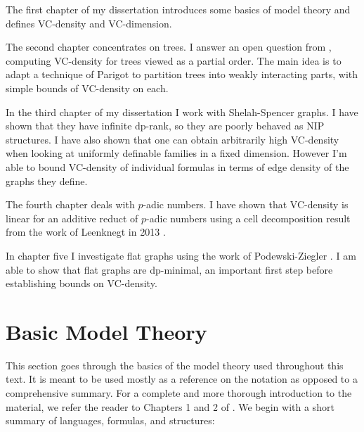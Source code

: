 The first chapter of my dissertation introduces some basics of model theory and defines VC-density and VC-dimension.

The second chapter concentrates on trees.
I answer an open question from \cite{density}, computing VC-density for trees viewed as a partial order.
The main idea is to adapt a technique of Parigot \cite{parigot_trees} to partition trees into weakly interacting parts, with simple bounds of VC-density on each.

In the third chapter of my dissertation I work with Shelah-Spencer graphs.
I have shown that they have infinite dp-rank, so they are poorly behaved as NIP structures.
I have also shown that one can obtain arbitrarily high VC-density when looking at uniformly definable families in a fixed dimension.
However I'm able to bound VC-density of individual formulas in terms of edge density of the graphs they define.

The fourth chapter deals with $p$-adic numbers.
I have shown that VC-density is linear for an additive reduct of $p$-adic numbers
using a cell decomposition result from the work of Leenknegt in 2013 \cite{reduct}.

In chapter five I investigate flat graphs using the work of
Podewski-Ziegler \cite {stable_graphs}.
I am able to show that flat graphs are dp-minimal, an important first step before establishing bounds on VC-density.

\section{Basic Model Theory}

This section goes through the basics of the model theory used throughout this text.
It is meant to be used mostly as a reference on the notation as opposed to a comprehensive summary.
For a complete and more thorough introduction to the material, we refer the reader to Chapters 1 and 2 of \cite{tent}.
We begin with a short summary of languages, formulas, and structures:

